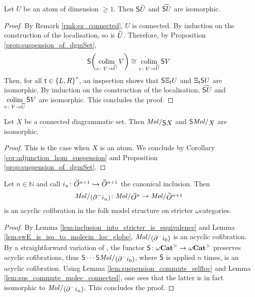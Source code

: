\begin{lem} \label{lem:suspension_commute_selfloc}
    Let \( U \) be an atom of dimension \( \geq 1 \).
    Then \( \mathsf{S}{\widetilde{U}} \) and \( \widetilde{\mathsf{S}{U}} \) are isomorphic. 
\end{lem}
\begin{proof}
    By Remark \ref{rmk:ez_connected}, \( U \) is connected.
    By induction on the construction of the localisation, so is \( \widetilde{U} \).
    Therefore, by Proposition \ref{prop:suspension_of_dgmSet}, 
    \begin{equation*}
        \mathsf{S}{\left(\operatorname*{colim}_{v \colon V \to \widetilde{U}} V\right)} \cong \operatorname*{colim}_{v \colon V \to \widetilde{U}} \mathsf{S}{V}
    \end{equation*}
    Then, for all \( \mathsf{t} \in \left\{ {L, R} \right\}^* \), an inspection shows that \( \mathsf{S}{\Xi_{\mathsf{t}}U} \) and \( \Xi_{\mathsf{t}} \mathsf{S}{U} \) are isomorphic.
    By induction on the construction of the localisation, \( \widetilde{\mathsf{S}{U}} \) and \( \operatorname*{colim}\limits_{v \colon V \to \widetilde{U}} \mathsf{S}{V} \) are isomorphic.    
    This concludes the proof.
\end{proof}

\begin{lem} \label{lem:sus_commute_molec_connected}
    Let \( X \) be a connected diagrammatic set.
    Then \( \molecin{\sus{X}} \) and \( \sus{\molecin{X}} \) are isomorphic.
\end{lem}
\begin{proof}
    This is the case when \( X \) is an atom. 
    We conclude by Corollary \ref{cor:adjunction_hom_suspension} and Proposition \ref{prop:suspension_of_dgmSet}.
\end{proof}

\begin{prop} \label{prop:walking_eq_of_dim_n}
    Let \( n \in \mathbb{N} \) and call \( i_n \colon \vec{O}^{n + 1} \hookrightarrow \widetilde{O}^{n + 1} \) the canonical inclusion.
    Then 
    \begin{equation*}
        \molecin{(\bd{}{-} i_n)} \colon \molecin{\dglobe{n}} \to \molecin{\rglobe{n + 1}} 
    \end{equation*}
    is an acyclic cofibration in the folk model structure on stricter \( \omega \)\nbd categories.
\end{prop}
\begin{proof}
    By Lemma \ref{lem:inclusion_into_stricter_is_equivalence} and Lemma \ref{lem:swE_is_iso_to_molecin_loc_globe}, \( \molecin{(\bd{}{-} i_0)} \) is an acyclic cofibration.
    By a straightforward variation of \cite[Proposition 2.8]{hadzihasanovic2024model}, the functor \( \mathsf{S}{} \colon {\omega\mathbf{Cat}}^> \to {\omega\mathbf{Cat}}^> \) preserves acyclic cofibrations, thus \( \sus{}\cdots\sus{\molecin{(\bd{}{-} i_0)}} \), where \( \mathsf{S}{} \) is applied \( n \) times, is an acyclic cofibration.
    Using Lemma \ref{lem:suspension_commute_selfloc} and Lemma \ref{lem:sus_commute_molec_connected}, one sees that the latter is in fact isomorphic to \( \molecin{(\bd{}{-} i_n)} \).
    This concludes the proof.
\end{proof}


